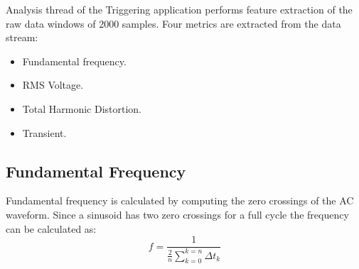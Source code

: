 Analysis thread of the Triggering application performs feature extraction of the raw data windows of 2000 samples.
Four metrics are extracted from the data stream:
\begin{itemize}
	\item Fundamental frequency.
	\item RMS Voltage.
	\item Total Harmonic Distortion.
	\item Transient.
\end{itemize}

\subsection{Fundamental Frequency}\label{subsec:fundamental-frequency}

Fundamental frequency is calculated by computing the zero crossings of the AC waveform.
Since a sinusoid has two zero crossings for a full cycle the frequency can be calculated as:
\begin{equation} \label{eq:1}
 f = \frac{1}{\frac{2}{n}\sum\limits_{k=0}^{k=n}{\Delta t_{k}}}  
\end{equation}

